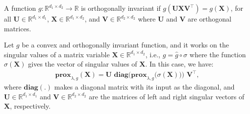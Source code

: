 \documentclass[lang=cn,10pt]{gorgeousnbook}
\numberwithin{equation}{section}%
\numberwithin{figure}{section}%
\begin{document}
\begin{lemma}\label{lemma_projection_onto_orthogonal_cone}
A function $g: \mathbb{R}^{d_1 \times d_2} \rightarrow \mathbb{R}$ is orthogonally invariant if $g(\boldsymbol{U}\boldsymbol{X}\boldsymbol{V}^\top) = g(\boldsymbol{X})$, for all $\boldsymbol{U} \in \mathbb{R}^{d_1 \times d_1}$, $\boldsymbol{X} \in \mathbb{R}^{d_1 \times d_2}$, and $\boldsymbol{V} \in \mathbb{R}^{d_2 \times d_2}$ where $\boldsymbol{U}$ and $\boldsymbol{V}$ are orthogonal matrices. 

Let $g$ be a convex and orthogonally invariant function, and it works on the singular values of a matrix variable $\boldsymbol{X} \in \mathbb{R}^{d_1 \times d_2}$, i.e., $g = \widehat{g} \circ \sigma$ where the function $\sigma(\boldsymbol{X})$ gives the vector of singular values of $\boldsymbol{X}$. In this case, we have:
\begin{align}\label{equation_prox_projection_orthogonal_matrices}
\textbf{prox}_{\lambda, g}(\boldsymbol{X}) = \boldsymbol{U}\,\, \textbf{diag}\Big(\textbf{prox}_{\lambda, g}\big(\sigma(\boldsymbol{X})\big)\Big)\,\, \boldsymbol{V}^\top,
\end{align}
where $\textbf{diag}(.)$ makes a diagonal matrix with its input as the diagonal, and $\boldsymbol{U} \in \mathbb{R}^{d_1 \times d_1}$ and $\boldsymbol{V} \in \mathbb{R}^{d_2 \times d_2}$ are the matrices of left and right singular vectors of $\boldsymbol{X}$, respectively.


\end{lemma}
\end{document}
